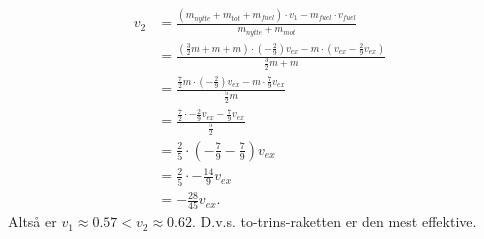 \documentclass[12pt]{article}
\theoremstyle{definition}
\begin{document}
\begin{align*}
  v_2 &= \frac{(m_{nytte} + m_{tot} + m_{fuel}) \cdot v_1 - m_{fuel}\cdot v_{fuel}}{m_{nytte} + m_{mot}} \\
      &= \frac{\left( \frac{3}{2}m + m + m \right)\cdot \left(-\frac{2}{9} \right)v_{ex} - m \cdot \left( v_{ex} -\frac{2}{9} v_{ex} \right)}{\frac{3}{2}m + m} \\
&= \frac{\frac{7}{2}m \cdot \left( -\frac{2}{9} \right)v_{ex} - m \cdot \frac{7}{9}v_{ex}}{\frac{5}{2}m} \\
&=\frac{\frac{7}{2} \cdot -\frac{2}{9} v_{ex} - \frac{7}{9}v_{e x}}{\frac{5}{2}} \\
&= \frac{2}{5} \cdot \left( -\frac{7}{9} - \frac{7}{9} \right)v_{ex} \\
&= \frac{2}{5} \cdot -\frac{14}{9} v_{ex} \\
&= -\frac{28}{45}v_{ex}
.\end{align*}
Altså er $v_1 \approx \num{0,57} < v_2 \approx \num{0,62}$. D.v.s. to-trins-raketten er den mest effektive.
\end{document}
